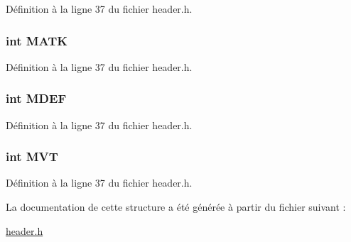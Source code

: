 Définition à la ligne 37 du fichier header.\-h.

\hypertarget{structt__stats_ae183b98dc9aca9905f531bfd4dd51a1c}{
\subsubsection[{M\-A\-T\-K}]{\setlength{\rightskip}{0pt plus 5cm}int M\-A\-T\-K}}\label{structt__stats_ae183b98dc9aca9905f531bfd4dd51a1c}


Définition à la ligne 37 du fichier header.\-h.

\hypertarget{structt__stats_a92ab6d75a95ed209b7875314f53fb555}{
\subsubsection[{M\-D\-E\-F}]{\setlength{\rightskip}{0pt plus 5cm}int M\-D\-E\-F}}\label{structt__stats_a92ab6d75a95ed209b7875314f53fb555}


Définition à la ligne 37 du fichier header.\-h.

\hypertarget{structt__stats_a397f7940443939415a50f324dc5f56f9}{
\subsubsection[{M\-V\-T}]{\setlength{\rightskip}{0pt plus 5cm}int M\-V\-T}}\label{structt__stats_a397f7940443939415a50f324dc5f56f9}


Définition à la ligne 37 du fichier header.\-h.



La documentation de cette structure a été générée à partir du fichier suivant \-:\begin{DoxyCompactItemize}
\item 
\hyperlink{header_8h}{header.\-h}\end{DoxyCompactItemize}
